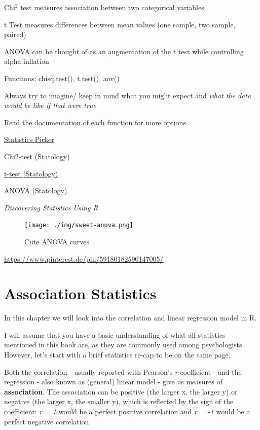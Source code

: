 \documentclass[
]{book}
\begin{document}
Chi\(^2\) test measures association between two categorical variables

t Test measures differences between mean values (one sample, two sample, paired)

ANOVA can be thought of as an augmentation of the t test while controlling alpha inflation

Functions: chisq.test(), t.test(), aov()

Always try to imagine/ keep in mind what you might expect and \emph{what the data would be like if that were true}

Read the documentation of each function for more options

\href{https://the-tave.shinyapps.io/Statistik-Picker/}{Statistics Picker}

\href{https://www.statology.org/chi-square-test-of-independence-in-r/}{Chi2-test (Statology)}

\href{https://www.statology.org/two-sample-t-test/}{t-test (Statology)}

\href{https://www.statology.org/interpret-anova-results-in-r/}{ANOVA (Statology)}

\emph{Discovering Statistics Using R} \citep{field2012}

\begin{figure}
\centering
\texttt{[image: ./img/sweet-anova.png]}
\caption{Cute ANOVA curves}
\end{figure}

\url{https://www.pinterest.de/pin/59180182590147005/}

\chapter{Association Statistics}\label{association-statistics}

In this chapter we will look into the correlation and linear regression model in R.

I will assume that you have a basic understanding of what all statistics mentioned in this book are, as they are commonly used among psychologists.
However, let's start with a brief statistics re-cap to be on the same page.

Both the correlation - usually reported with Pearson's \emph{r} coefficient - and the regression - also known as (general) linear model - give us measures of \textbf{association}.
The association can be positive (the larger x, the larger y) or negative (the larger x, the smaller y), which is reflected by the sign of the coefficient: \emph{r = 1} would be a perfect positive correlation and \emph{r = -1} would be a perfect negative correlation.
\end{document}
